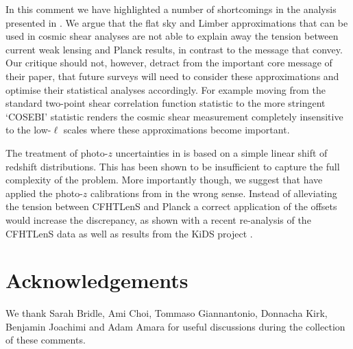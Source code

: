 In this comment we have highlighted a number of shortcomings in the analysis presented in \cite{kitching/etal:2016}.  We argue that the flat sky and Limber approximations that can be used in cosmic shear analyses are not able to explain away the tension between current weak lensing and Planck results, in contrast to the message that \cite{kitching/etal:2016} convey.  Our critique should not, however, detract from the important core message of their paper, that future surveys will need to consider these approximations and optimise their statistical analyses accordingly.  For example moving from the standard two-point shear correlation function statistic to the more stringent `COSEBI' statistic \citep{schneider/etal:2010} renders the cosmic shear measurement completely insensitive to the low-$\ell$ scales where these approximations become important.  

The treatment of photo-$z$ uncertainties in \cite{kitching/etal:2016} is based on a simple linear shift of redshift distributions. This has been shown to be insufficient to capture the full complexity of the problem.  More importantly though, we suggest that \cite{kitching/etal:2016} have applied the photo-$z$ calibrations from \cite{choi/etal:2016} in the wrong sense. Instead of alleviating the tension between CFHTLenS and Planck a correct application of the offsets would increase the discrepancy, as shown with a recent re-analysis of the CFHTLenS data \citep{joudaki/etal:2016} as well as results from the KiDS project \citep{hildebrandt/etal:2016}.

\section{Acknowledgements}
We thank Sarah Bridle, Ami Choi, Tommaso Giannantonio, Donnacha Kirk, Benjamin Joachimi and Adam Amara for useful discussions during the collection of these comments.